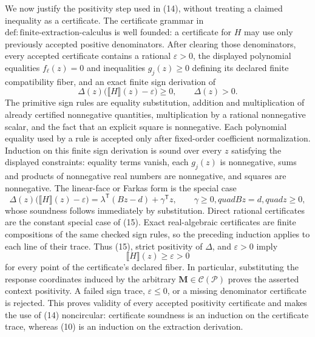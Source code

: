 We now justify the positivity step used in (14), without treating a claimed inequality as a certificate.  The certificate grammar in \(\mathrm{def:finite\text{-}extraction\text{-}calculus}\) is well founded: a certificate for \(H\) may use only previously accepted positive denominators.  After clearing those denominators, every accepted certificate contains a rational \(\varepsilon>0\), the displayed polynomial equalities \(f_\ell(z)=0\) and inequalities \(g_j(z)\ge0\) defining its declared finite compatibility fiber, and an exact finite sign derivation of
\[
\Delta(z)\bigl(\llbracket H\rrbracket(z)-\varepsilon\bigr)\ge0,
\qquad \Delta(z)>0.
\tag{15}
\]
The primitive sign rules are equality substitution, addition and multiplication of already certified nonnegative quantities, multiplication by a rational nonnegative scalar, and the fact that an explicit square is nonnegative.  Each polynomial equality used by a rule is accepted only after fixed-order coefficient normalization.  Induction on this finite sign derivation is sound over every \(z\) satisfying the displayed constraints: equality terms vanish, each \(g_j(z)\) is nonnegative, sums and products of nonnegative real numbers are nonnegative, and squares are nonnegative.  The linear-face or Farkas form is the special case
\[
\Delta(z)\bigl(\llbracket H\rrbracket(z)-\varepsilon\bigr)
=\lambda^{\mathsf T}(Bz-d)+\gamma^{\mathsf T}z,
\qquad \gamma\ge0,quad Bz=d,quad z\ge0,
\tag{16}
\]
whose soundness follows immediately by substitution.  Direct rational certificates are the constant special case of (15).  Exact real-algebraic certificates are finite compositions of the same checked sign rules, so the preceding induction applies to each line of their trace.  Thus (15), strict positivity of \(\Delta\), and \(\varepsilon>0\) imply
\[
\llbracket H\rrbracket(z)\ge\varepsilon>0
\tag{17}
\]
for every point of the certificate's declared fiber.  In particular, substituting the response coordinates induced by the arbitrary \(\mathbf M\in\mathcal C(\mathcal P)\) proves the asserted context positivity.  A failed sign trace, \(\varepsilon\le0\), or a missing denominator certificate is rejected.  This proves validity of every accepted positivity certificate and makes the use of (14) noncircular: certificate soundness is an induction on the certificate trace, whereas (10) is an induction on the extraction derivation.

